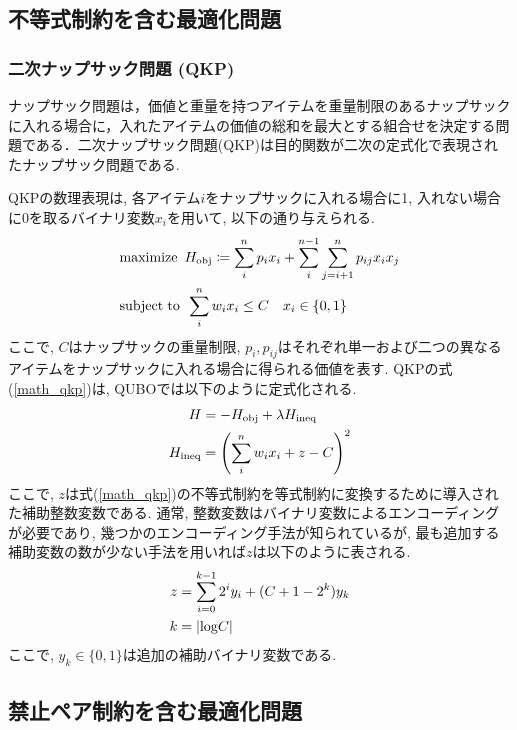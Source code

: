 \documentclass[submit,techrep,noauthor]{ipsj}
\begin{document}
\subsection{不等式制約を含む最適化問題}

\subsubsection{二次ナップサック問題 (QKP)}
ナップサック問題は，価値と重量を持つアイテムを重量制限のあるナップサックに入れる場合に，入れたアイテムの価値の総和を最大とする組合せを決定する問題である．二次ナップサック問題(QKP)は目的関数が二次の定式化で表現されたナップサック問題である. 

QKPの数理表現は, 各アイテム$i$をナップサックに入れる場合に1, 入れない場合に0を取るバイナリ変数$x_{i}$を用いて, 以下の通り与えられる.
\begin{align}
&{\rm{maximize}\hspace{5pt}} H_{\rm{obj}}\coloneq\sum_{i}^{n}p_{i}x_{i}+\sum_{i}^{n-1}\sum_{j=i+1}^{n}p_{ij}x_{i}x_{j}\nonumber\\
&{\rm{subject}\hspace{3pt}\rm{to}\hspace{5pt}} \sum_{i}^{n}w_{i}x_{i}\le C \hspace{10pt} x_{i}\in \{0, 1\} \label{math_qkp}
\end{align}
ここで, $C$はナップサックの重量制限, $p_{i}, p_{ij}$はそれぞれ単一および二つの異なるアイテムをナップサックに入れる場合に得られる価値を表す. QKPの式(\ref{math_qkp})は, QUBOでは以下のように定式化される.
\begin{align}
H &= -H_{\rm{obj}} + \lambda H_{\rm{ineq}}\nonumber\\
H_{\rm{ineq}} &= \left(\sum_{i}^{n}w_{i}x_{i}+z-C\right)^{2} \label{ham_qkp}
\end{align}
ここで, $z$は式(\ref{math_qkp})の不等式制約を等式制約に変換するために導入された補助整数変数である. 通常, 整数変数はバイナリ変数によるエンコーディングが必要であり, 幾つかのエンコーディング手法が知られているが, 最も追加する補助変数の数が少ない手法を用いれば$z$は以下のように表される.
\begin{align}
z &= \sum_{i=0}^{k-1}2^{i}y_{i}+(C+1-2^{k})y_{k}\nonumber\\
k &= |{\rm{log}}C|
\end{align}
ここで, $y_{k}\in \{0, 1\}$は追加の補助バイナリ変数である.

\subsection{禁止ペア制約を含む最適化問題}
\end{document}
